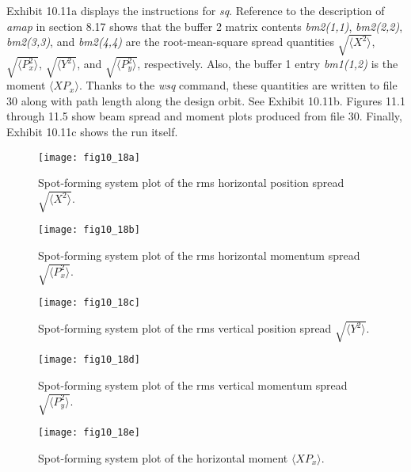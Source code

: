Exhibit 10.11a displays the instructions for {\em sq}.  Reference to the
description of {\em amap} in section 8.17 shows that the buffer 2 matrix
contents {\em bm2(1,1)}, {\em bm2(2,2)}, {\em bm2(3,3)}, and {\em
bm2(4,4)} are the root-mean-square spread quantities $\sqrt{\langle
X^2\rangle}$, $\sqrt{\langle P_x^2\rangle}$, $\sqrt{\langle Y^2\rangle}$,
and $\sqrt{\langle
P_y^2\rangle}$, respectively.  Also, the buffer 1 entry {\em bm1(1,2)} is
the moment $\langle XP_x\rangle$.  Thanks to the {\em wsq} command,
these quantities are written to file 30 along with path length along the
design orbit.  See Exhibit 10.11b.  Figures 11.1 through 11.5 show beam spread
and moment plots produced from file 30.  Finally, Exhibit 10.11c shows the
\Mary run itself.

\newpage
\begin{figure}[htbp]
\renewcommand{\thefigure}{\thesection.\arabic{figure}}
  \centering
  \texttt{[image: fig10\_18a]}
  \caption{Spot-forming system plot of the rms horizontal position
spread $\sqrt{\langle X^2\rangle}$.}
\end{figure}

\newpage
\begin{figure}[htbp]
\renewcommand{\thefigure}{\thesection.\arabic{figure}}
  \centering
  \texttt{[image: fig10\_18b]}
  \caption{Spot-forming system plot of the rms horizontal momentum
spread $\sqrt{\langle P_x^2\rangle}$.}
\end{figure}

\newpage
\begin{figure}[htbp]
\renewcommand{\thefigure}{\thesection.\arabic{figure}}
  \centering
  \texttt{[image: fig10\_18c]}
  \caption{Spot-forming system plot of the rms vertical position
spread $\sqrt{\langle Y^2\rangle}$.}
\end{figure}

\newpage
\begin{figure}[htbp]
\renewcommand{\thefigure}{\thesection.\arabic{figure}}
  \centering
  \texttt{[image: fig10\_18d]}
  \caption{Spot-forming system plot of the rms vertical momentum
spread $\sqrt{\langle P_y^2\rangle}$.}
\end{figure}

\newpage
\begin{figure}[htbp]
\renewcommand{\thefigure}{\thesection.\arabic{figure}}
  \centering
  \texttt{[image: fig10\_18e]}
  \caption{Spot-forming system plot of the horizontal moment
$\langle XP_x\rangle$.}
\end{figure}

